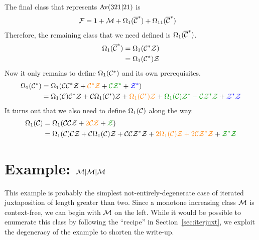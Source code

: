 \documentclass[12pt, a4paper, twoside]{report}
\begin{document}
The final class that represents $\mathrm{Av}(321|21)$ is 
\begin{align}
  \mathcal{F} &= 1 + \mathcal{M} + \Omega_1(\overline{\mathcal{C}}^*) + \Omega_{11}(\overline{\mathcal{C}}^*)
      \label{eq:example_final}
\end{align}
Therefore, the remaining class that we need defined is $\Omega_1(\overline{\mathcal{C}}^*)$.
\begin{align}
  \begin{aligned}
    \Omega_1(\overline{\mathcal{C}}^*) &= \Omega_1(\mathcal{C}^*\mathcal{Z})\\
    &= \Omega_1(\mathcal{C}^*)\mathcal{Z}
  \end{aligned}
  \label{eq:omega1barCstar}
\end{align}
Now it only remains to define $\Omega_1(\mathcal{C}^*)$ and its own prerequisites. 
\begin{align}
  \begin{aligned}
    \Omega_1(\Cstar) &= \Omega_1(\C\Cstar\Z + \textcolor{orange}{\Cstar\Z} + \textcolor{green}{\C\Z^*} + \textcolor{blue}{\Z^*})\\
    &= \Omega_1(\C)\Cstar\Z + \C\Omega_1(\Cstar)\Z + \textcolor{orange}{\Omega_1(\Cstar)\Z} + \textcolor{green}{\Omega_1(\C)\Z^* + \C\Z^*\Z} + \textcolor{blue}{\Z^*\Z}
  \end{aligned}
  \label{eq:exampleAv321Av21_omega1Cstar}
\end{align}
It turns out that we also need to define $\Omega_1(\mathcal{C})$ along the way.
\begin{align}
  \begin{aligned}
    \Omega_1(\C) &= \Omega_1(\C\C\Z + \textcolor{orange}{2\C\Z} + \textcolor{green}{\Z})\\
    &= \Omega_1(\C)\C\Z + \C\Omega_1(\C)\Z + \C\C\Z^*\Z + \textcolor{orange}{2\Omega_1(\C)\Z + 2\C\Z^*\Z} + \textcolor{green}{\Z^*\Z}
  \end{aligned}
  \label{eq:omega1C}
\end{align}

\section{Example: $\mathcal{M}|\mathcal{M}|\mathcal{M}$}
\label{sec:example_mmm}
This example is probably the simplest not-entirely-degenerate case of iterated juxtaposition of length greater than two. Since a monotone increasing class $\mathcal{M}$ is context-free, we can begin with $\mathcal{M}$ on the left. While it would be possible to enumerate this class by following the ``recipe'' in Section~\ref{sec:iterjuxt}, we exploit the degeneracy of the example to shorten the write-up.
\end{document}
